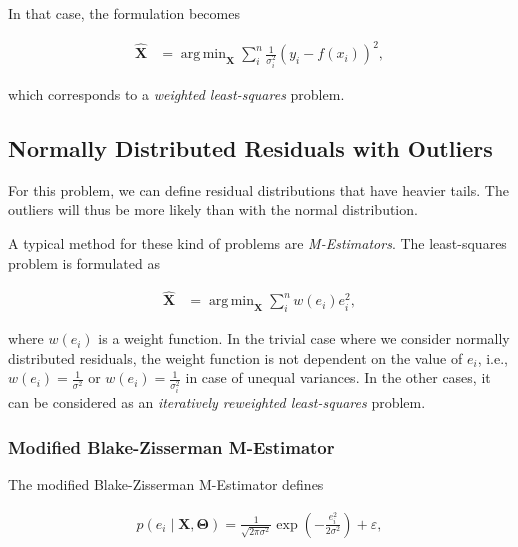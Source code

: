 \documentclass[12pt]{article}
\DeclareMathOperator*{\argmin}{arg\,min}
\begin{document}
      In that case, the formulation becomes

      \begin{equation}\label{eqn:model1dminllnorm2}
        \begin{aligned}
        \mathbf{\hat{X}} &=
          \argmin_{\mathbf{X}}\sum_i^n \frac{1}{\sigma_i^2}(y_i-f(x_i))^2,
        \end{aligned}
      \end{equation}

      \noindent which corresponds to a \emph{weighted least-squares} problem.

    \subsection{Normally Distributed Residuals with Outliers}

      For this problem, we can define residual distributions that have heavier
      tails. The outliers will thus be more likely than with the normal
      distribution.

      A typical method for these kind of problems are \emph{M-Estimators}. The
      least-squares problem is formulated as

      \begin{equation}\label{eqn:model1dMEstimator}
        \begin{aligned}
        \mathbf{\hat{X}} &=
          \argmin_{\mathbf{X}}\sum_i^n w(e_i)e_i^2,
        \end{aligned}
      \end{equation}

      \noindent where $w(e_i)$ is a weight function. In the trivial case where
      we consider normally distributed residuals, the weight function is
      not dependent on the value of $e_i$, i.e., $w(e_i)=\frac{1}{\sigma^2}$ or
      $w(e_i)=\frac{1}{\sigma_i^2}$ in case of unequal variances. In the other
      cases, it can be considered as an
      \emph{iteratively reweighted least-squares} problem.

      \subsubsection{Modified Blake-Zisserman M-Estimator}

        The modified Blake-Zisserman M-Estimator defines

        \begin{equation}\label{eqn:model1dnormresidualspdfbz}
          \begin{aligned}
          p(e_i\mid\mathbf{X},\boldsymbol{\Theta}) =
            \frac{1}{\sqrt{2\pi\sigma^2}}
            \exp(-\frac{e_i^2}{2\sigma^2}) + \varepsilon,
          \end{aligned}
        \end{equation}
\end{document}
